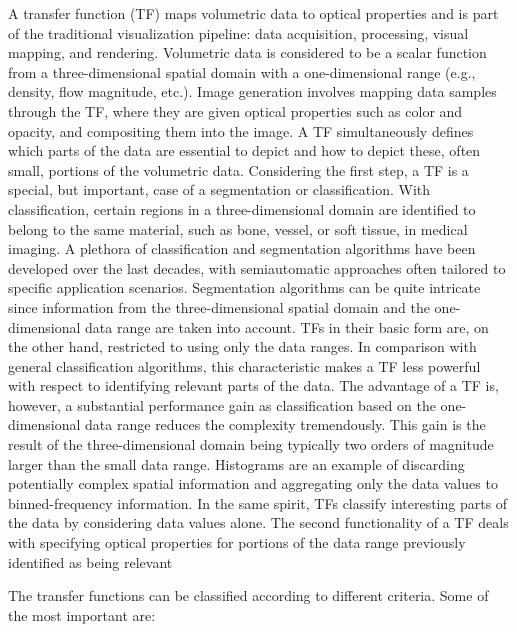 A transfer function (TF) maps volumetric data to optical properties
and is part of the traditional visualization pipeline: data acquisition,
processing, visual mapping, and rendering. Volumetric data is
considered to be a scalar function from a three-dimensional spatial
domain with a one-dimensional range (e.g., density, flow magnitude,
etc.). Image generation involves mapping data samples through the
TF, where they are given optical properties such as color and opacity,
and compositing them into the image.
A TF simultaneously defines which parts of the data are essential
to depict and how to depict these, often small, portions
of the volumetric data. Considering the first step, a TF is a special,
but important, case of a segmentation or classification. With classification, certain regions in a three-dimensional domain are identified
to belong to the same material, such as bone, vessel, or soft tissue, in medical imaging. A plethora of classification and segmentation
algorithms have been developed over the last decades, with semiautomatic
approaches often tailored to specific application scenarios.
Segmentation algorithms can be quite intricate since information
from the three-dimensional spatial domain and the one-dimensional
data range are taken into account. TFs in their basic form are, on the
other hand, restricted to using only the data ranges. In comparison
with general classification algorithms, this characteristic makes a
TF less powerful with respect to identifying relevant parts of the
data. The advantage of a TF is, however, a substantial performance
gain as classification based on the one-dimensional data range reduces
the complexity tremendously. This gain is the result of the
three-dimensional domain being typically two orders of magnitude
larger than the small data range. Histograms are an example of discarding
potentially complex spatial information and aggregating
only the data values to binned-frequency information. In the same
spirit, TFs classify interesting parts of the data by considering data
values alone. The second functionality of a TF deals with specifying
optical properties for portions of the data range previously identified
as being relevant

The transfer functions can be classified according to different criteria. Some of the most important are:

